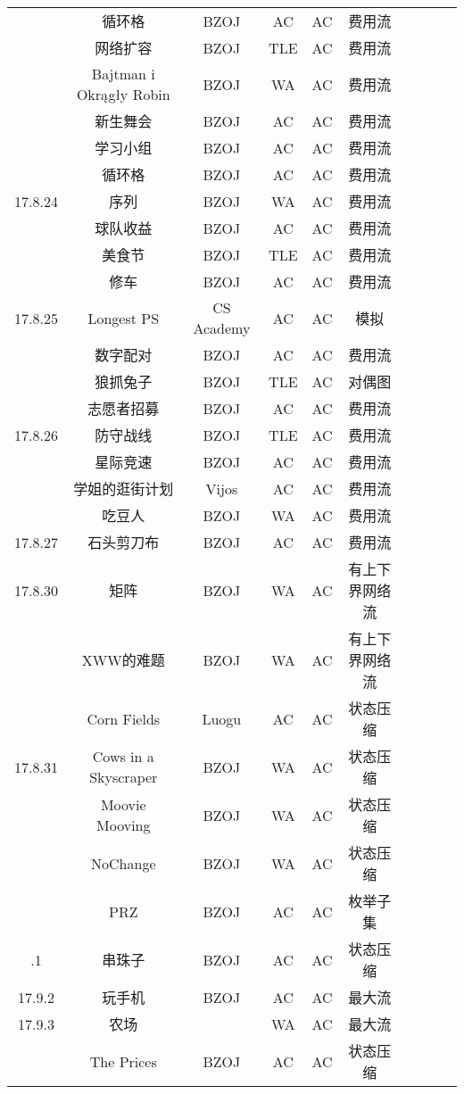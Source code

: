 \documentclass[landscape]{article}
\begin{document}
\begin{longtable}{cccccccccc}
  & 循环格 & BZOJ & AC & AC & 费用流\\
  & 网络扩容 & BZOJ & TLE & AC & 费用流\\
  & Bajtman i Okrągły Robin & BZOJ & WA & AC & 费用流\\
  & 新生舞会 & BZOJ & AC & AC & 费用流\\
  & 学习小组 & BZOJ & AC & AC & 费用流\\
  & 循环格 & BZOJ & AC & AC & 费用流\\
  \hline
  17.8.24 & 序列 & BZOJ & WA & AC & 费用流\\
  & 球队收益 & BZOJ & AC & AC & 费用流\\
  & 美食节 & BZOJ & TLE & AC & 费用流\\
  & 修车 & BZOJ & AC & AC & 费用流\\
  \hline
  17.8.25 & Longest PS & CS Academy & AC & AC & 模拟\\
  & 数字配对 & BZOJ & AC & AC & 费用流\\
  & 狼抓兔子 & BZOJ & TLE & AC & 对偶图\\
  & 志愿者招募 & BZOJ & AC & AC & 费用流\\
  \hline
  17.8.26 & 防守战线 & BZOJ & TLE & AC & 费用流\\
  & 星际竞速 & BZOJ & AC & AC & 费用流\\
  & 学姐的逛街计划 & Vijos & AC & AC & 费用流\\
  & 吃豆人 & BZOJ & WA & AC & 费用流\\
  \hline
  17.8.27 & 石头剪刀布 & BZOJ & AC & AC & 费用流\\
  \hline
  17.8.30 & 矩阵 & BZOJ & WA & AC & 有上下界网络流\\
  & XWW的难题 & BZOJ & WA & AC & 有上下界网络流\\
  & Corn Fields & Luogu & AC & AC & 状态压缩\\
  \hline
  17.8.31 & Cows in a Skyscraper & BZOJ & WA & AC & 状态压缩\\
  & Moovie Mooving & BZOJ & WA & AC & 状态压缩\\
  & NoChange & BZOJ & WA & AC & 状态压缩\\
  & PRZ & BZOJ & AC & AC & 枚举子集\\
  \newpage
  \hline
  17.9.1 & 串珠子 & BZOJ & AC & AC & 状态压缩\\
  \hline
  17.9.2 & 玩手机 & BZOJ & AC & AC & 最大流\\
  \hline
  17.9.3 & 农场 & & WA & AC & 最大流\\
  & The Prices & BZOJ & AC & AC & 状态压缩\\

\end{longtable}
\end{document}
